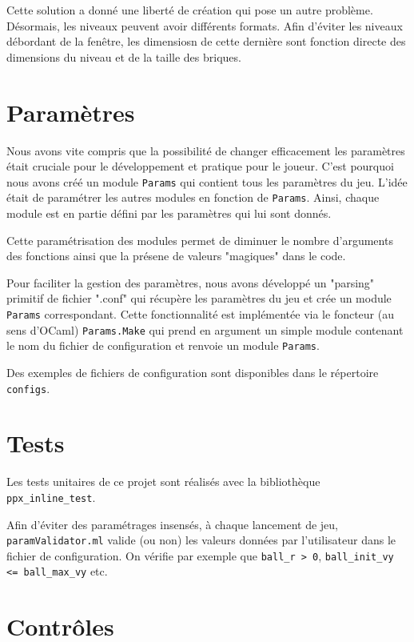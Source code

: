\documentclass[french]{template}
\begin{document}
Cette solution a donné une liberté de création qui pose un autre problème. Désormais, les niveaux peuvent avoir différents formats. Afin d'éviter les niveaux débordant de la fenêtre, les dimensiosn de cette dernière sont fonction directe des dimensions du niveau et de la taille des briques.

\section{Paramètres}

Nous avons vite compris que la possibilité de changer efficacement les paramètres était cruciale pour le développement et pratique pour le joueur. C'est pourquoi nous avons créé un module \texttt{Params} qui contient tous les paramètres du jeu. L'idée était de paramétrer les autres modules en fonction de \texttt{Params}. Ainsi, chaque module est en partie défini par les paramètres qui lui sont donnés.

Cette paramétrisation des modules permet de diminuer le nombre d'arguments des fonctions ainsi que la présene de valeurs "magiques" dans le code.

Pour faciliter la gestion des paramètres, nous avons développé un "parsing" primitif de fichier ".conf" qui récupère les paramètres du jeu et crée un module \texttt{Params} correspondant. Cette fonctionnalité est implémentée via le foncteur (au sens d'OCaml) \texttt{Params.Make} qui prend en argument un simple module contenant le nom du fichier de configuration et renvoie un module \texttt{Params}.

Des exemples de fichiers de configuration sont disponibles dans le répertoire \texttt{configs}.

\section{Tests}

Les tests unitaires de ce projet sont réalisés avec la bibliothèque \texttt{ppx\_inline\_test}.

Afin d'éviter des paramétrages insensés, à chaque lancement de jeu, \texttt{paramValidator.ml} valide (ou non) les valeurs données par l'utilisateur dans le fichier de configuration. On vérifie par exemple que \texttt{ball\_r > 0}, \texttt{ball\_init\_vy <= ball\_max\_vy} etc.

\section{Contrôles}
\end{document}
